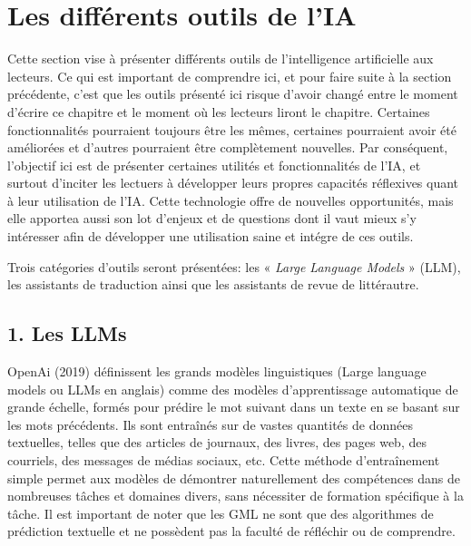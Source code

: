 \documentclass[
  letterpaper,
  DIV=11,
  numbers=noendperiod]{scrreprt}
\begin{document}
\section{Les différents outils de
l'IA}\label{les-diffuxe9rents-outils-de-lia}

Cette section vise à présenter différents outils de l'intelligence
artificielle aux lecteurs. Ce qui est important de comprendre ici, et
pour faire suite à la section précédente, c'est que les outils présenté
ici risque d'avoir changé entre le moment d'écrire ce chapitre et le
moment où les lecteurs liront le chapitre. Certaines fonctionnalités
pourraient toujours être les mêmes, certaines pourraient avoir été
améliorées et d'autres pourraient être complètement nouvelles. Par
conséquent, l'objectif ici est de présenter certaines utilités et
fonctionnalités de l'IA, et surtout d'inciter les lectuers à développer
leurs propres capacités réflexives quant à leur utilisation de l'IA.
Cette technologie offre de nouvelles opportunités, mais elle apportea
aussi son lot d'enjeux et de questions dont il vaut mieux s'y intéresser
afin de développer une utilisation saine et intégre de ces outils.

Trois catégories d'outils seront présentées: les « \emph{Large Language
Models} » (LLM), les assistants de traduction ainsi que les assistants
de revue de littérautre.

\subsection{1. Les LLMs}\label{les-llms}

OpenAi (2019) définissent les grands modèles linguistiques (Large
language models ou LLMs en anglais) comme des modèles d'apprentissage
automatique de grande échelle, formés pour prédire le mot suivant dans
un texte en se basant sur les mots précédents. Ils sont entraînés sur de
vastes quantités de données textuelles, telles que des articles de
journaux, des livres, des pages web, des courriels, des messages de
médias sociaux, etc. Cette méthode d'entraînement simple permet aux
modèles de démontrer naturellement des compétences dans de nombreuses
tâches et domaines divers, sans nécessiter de formation spécifique à la
tâche. Il est important de noter que les GML ne sont que des algorithmes
de prédiction textuelle et ne possèdent pas la faculté de réfléchir ou
de comprendre.
\end{document}
